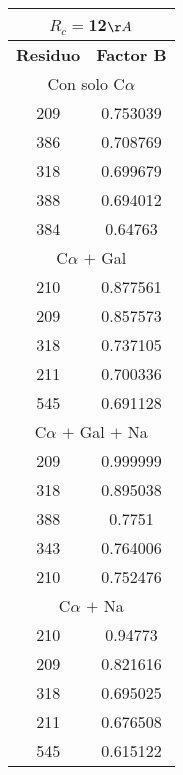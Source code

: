 \begin{tabular}[c]{|c|c|}
\multicolumn{2}{c}{$R_c=$12$\AA$}\\\hline
\textbf{Residuo}&\textbf{Factor B}\\\hline
\multicolumn{2}{c}{Con solo C$\alpha$}\\\hline
       209&  0.753039\\
       386&  0.708769\\
       318&  0.699679\\
       388&  0.694012\\
       384&   0.64763\\
\hline
\multicolumn{2}{c}{C$\alpha$ $+$ Gal}\\\hline
       210&  0.877561\\
       209&  0.857573\\
       318&  0.737105\\
       211&  0.700336\\
       545&  0.691128\\
\hline
\multicolumn{2}{c}{C$\alpha$ $+$ Gal $+$ Na}\\\hline
       209&  0.999999\\
       318&  0.895038\\
       388&    0.7751\\
       343&  0.764006\\
       210&  0.752476\\
\hline
\multicolumn{2}{c}{C$\alpha$ $+$ Na}\\\hline
       210&   0.94773\\
       209&  0.821616\\
       318&  0.695025\\
       211&  0.676508\\
       545&  0.615122\\
\hline
\end{tabular}
